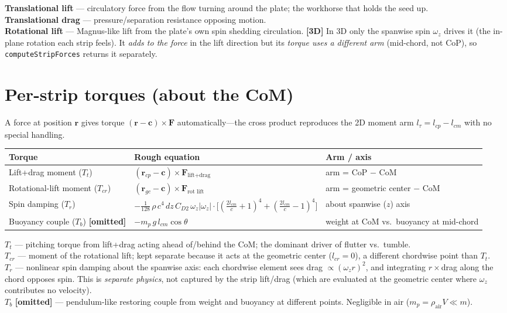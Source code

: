 \documentclass[11pt]{article}
\newcommand{\newin}{{\small\textbf{\color{blue}[3D]}}}          %
\newcommand{\drop}{{\small\textbf{\color{red!70!black}[omitted]}}} %
\begin{document}
\medskip
\noindent\textbf{Translational lift} — circulatory force from the flow turning
around the plate; the workhorse that holds the seed up.\\
\textbf{Translational drag} — pressure/separation resistance opposing motion.\\
\textbf{Rotational lift} — Magnus-like lift from the plate's own spin shedding
circulation. \newin{} In 3D only the spanwise spin $\omega_z$ drives it (the in-plane
rotation each strip feels). It \emph{adds to the force} in the lift direction but its
\emph{torque uses a different arm} (mid-chord, not CoP), so \texttt{computeStripForces}
returns it separately.

\section*{Per-strip torques (about the CoM)}
A force at position $\mathbf{r}$ gives torque $(\mathbf{r}-\mathbf{c})\times\mathbf{F}$
automatically---the cross product reproduces the 2D moment arm $l_\tau=l_{cp}-l_{cm}$
with no special handling.

\begin{tabularx}{\textwidth}{@{} l >{\raggedright\arraybackslash}p{} L @{}}
\toprule
\textbf{Torque} & \textbf{Rough equation} & \textbf{Arm / axis} \\
\midrule
Lift+drag moment ($T_t$) &
$(\mathbf{r}_{cp}-\mathbf{c})\times \mathbf{F}_{\text{lift+drag}}$ &
arm = CoP $-$ CoM \\

Rotational-lift moment ($T_{cr}$) &
$(\mathbf{r}_{gc}-\mathbf{c})\times \mathbf{F}_{\text{rot lift}}$ &
arm = geometric center $-$ CoM \\

Spin damping ($T_r$) &
$-\tfrac{1}{128}\,\rho\,c^4\,dz\,C_{D2}\,\omega_z|\omega_z|\cdot\big[(\tfrac{2l_{cm}}{c}{+}1)^4{+}(\tfrac{2l_{cm}}{c}{-}1)^4\big]$ &
about spanwise ($z$) axis \\

Buoyancy couple ($T_b$) \drop{} &
$-m_p\,g\,l_{cm}\cos\theta$ &
weight at CoM vs.\ buoyancy at mid-chord \\
\bottomrule
\end{tabularx}

\medskip
\noindent\textbf{$T_t$} — pitching torque from lift+drag acting ahead of/behind the
CoM; the dominant driver of flutter vs.\ tumble.\\
\textbf{$T_{cr}$} — moment of the rotational lift; kept separate because it acts at the
geometric center ($l_{cr}=0$), a different chordwise point than $T_t$.\\
\textbf{$T_r$} — nonlinear spin damping about the spanwise axis: each chordwise element
sees drag $\propto(\omega_z r)^2$, and integrating $r\times$drag along the chord opposes
spin. This is \emph{separate physics}, not captured by the strip lift/drag (which are
evaluated at the geometric center where $\omega_z$ contributes no velocity).\\
\textbf{$T_b$} \drop{} — pendulum-like restoring couple from weight and buoyancy at
different points. Negligible in air ($m_p=\rho_{\text{air}}V\ll m$).
\end{document}

